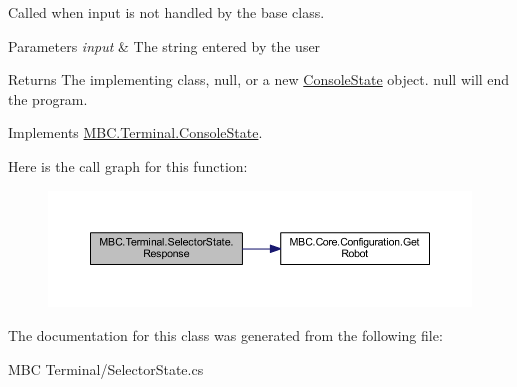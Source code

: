 Called when input is not handled by the base class.


\begin{DoxyParams}{Parameters}
{\em input} & The string entered by the user\\
\hline
\end{DoxyParams}
\begin{DoxyReturn}{Returns}
The implementing class, null, or a new \hyperlink{class_m_b_c_1_1_terminal_1_1_console_state}{Console\-State} object. null will end the program.
\end{DoxyReturn}


Implements \hyperlink{class_m_b_c_1_1_terminal_1_1_console_state_a93d6eee582913a59d10348cdc8ef4248}{M\-B\-C.\-Terminal.\-Console\-State}.



Here is the call graph for this function\-:
\nopagebreak
\begin{figure}[H]
\begin{center}
\leavevmode
\includegraphics[width=350pt]{class_m_b_c_1_1_terminal_1_1_selector_state_ad5790cf53b3c3da6269fe2faf9a0e871_cgraph}
\end{center}
\end{figure}




The documentation for this class was generated from the following file\-:\begin{DoxyCompactItemize}
\item 
M\-B\-C Terminal/Selector\-State.\-cs\end{DoxyCompactItemize}
